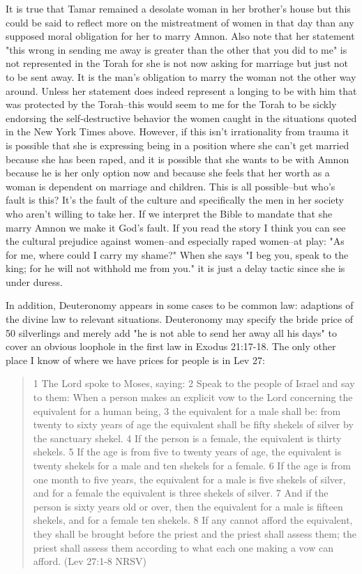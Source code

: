 \documentclass[11pt]{article}
\begin{document}
It is true that Tamar remained a desolate woman in her brother's house but this could be said to reflect more on the mistreatment of women in that day than any supposed moral obligation for her to marry Amnon. Also note that her statement "this wrong in sending me away is greater than the other that you did to me" is not represented in the Torah for she is not now asking for marriage but just not to be sent away. It is the man's obligation to marry the woman not the other way around. Unless her statement does indeed represent a longing to be with him that was protected by the Torah--this would seem to me for the Torah to be sickly endorsing the self-destructive behavior the women caught in the situations quoted in the New York Times above. However, if this isn't irrationality from trauma it is possible that she is expressing being in a position where she can't get married because she has been raped, and it is possible that she wants to be with Amnon because he is her only option now and because she feels that her worth as a woman is dependent on marriage and children. This is all possible--but who's fault is this? It's the fault of the culture and specifically the men in her society who aren't willing to take her. If we interpret the Bible to mandate that she marry Amnon we make it God's fault. If you read the story I think you can see the cultural prejudice against women--and especially raped women--at play: "As for me, where could I carry my shame?" When she says "I beg you, speak to the king; for he will not withhold me from you." it is just a delay tactic since she is under duress. 

In addition, Deuteronomy appears in some cases to be common law: adaptions of the divine law to relevant situations. Deuteronomy may specify the bride price of 50 silverlings and merely add "he is not able to send her away all his days" to cover an obvious loophole in the first law in Exodus 21:17-18. The only other place I know of where we have prices for people is in Lev 27:

\begin{quote}
1 The Lord spoke to Moses, saying: 2 Speak to the people of Israel and say to them: When a person makes an explicit vow to the Lord concerning the equivalent for a human being, 3 the equivalent for a male shall be: from twenty to sixty years of age the equivalent shall be fifty shekels of silver by the sanctuary shekel. 4 If the person is a female, the equivalent is thirty shekels. 5 If the age is from five to twenty years of age, the equivalent is twenty shekels for a male and ten shekels for a female. 6 If the age is from one month to five years, the equivalent for a male is five shekels of silver, and for a female the equivalent is three shekels of silver. 7 And if the person is sixty years old or over, then the equivalent for a male is fifteen shekels, and for a female ten shekels. 8 If any cannot afford the equivalent, they shall be brought before the priest and the priest shall assess them; the priest shall assess them according to what each one making a vow can afford. (Lev 27:1-8 NRSV)
\end{quote} 
\end{document}

